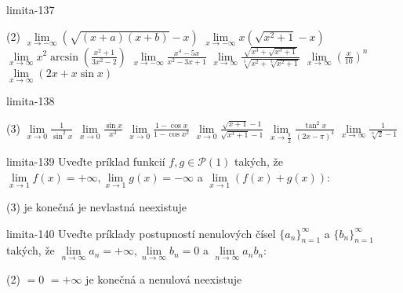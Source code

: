 \begin{defproblem}{limita-137}
\begin{tasks}(2)
    \task $\lim\limits_{{x \rightarrow -\infty}} (\sqrt{(x+a)(x+b)}-x)$
    \task $\lim\limits_{{x \rightarrow -\infty}} x(\sqrt{x^2+1}-x)$
    \task $\lim\limits_{{x \rightarrow \infty}} x^2 \arcsin(\frac{x^2+1}{3x^2-2})$
    \task $\lim\limits_{{x \rightarrow -\infty}} \frac{x^4-5x}{x^2-3x+1}$
    \task $\lim\limits_{{x \rightarrow \infty}} \frac{\sqrt{x^3+\sqrt{x^3+1}}}{\sqrt[3]{x^2+\sqrt[3]{x^2+1}}}$
    \task $\lim\limits_{{x \rightarrow \infty}} (\frac{x}{10})^n$
    \task $\lim\limits_{{x \rightarrow \infty}} (2x+x \sin x)$
\end{tasks}
\end{defproblem}

\begin{defproblem}{limita-138}
\begin{tasks}(3)
    \task $\lim\limits_{{x \rightarrow 0}} \frac{1}{\sin ^2 x}$
    \task $\lim\limits_{{x \rightarrow 0}} \frac{\sin x}{x^3}$
    \task $\lim\limits_{{x \rightarrow 0}} \frac{1-\cos x}{1-\cos x^2}$
    \task $\lim\limits_{{x \rightarrow 0}} \frac{\sqrt{x+1}-1}{\sqrt{x^3+1}-1}$
    \task $\lim\limits_{{x \rightarrow \frac{\pi}{2}}} \frac{\tan ^2 x}{(2x-\pi)^4}$
    \task $\lim\limits_{{x \rightarrow \infty}} \frac{1}{\sqrt[n]{2}-1}$
\end{tasks}
\end{defproblem}

\begin{defproblem}{limita-139}
Uveďte príklad funkcií $f,g \in \mathcal{P}(1)$ takých, že $\lim\limits_{x
\rightarrow 1} f(x)=+\infty,\lim\limits_{x \rightarrow 1} g(x)=-\infty$ a
$\lim\limits_{x \rightarrow 1} (f(x)+g(x))$:
\begin{tasks}(3)
\task je konečná
\task je nevlastná
\task neexistuje
\end{tasks}
\end{defproblem}

\begin{defproblem}{limita-140}
Uveďte príklady postupností nenulových čísel ${\{a_n\}}_{n=1}^\infty$ a
${\{b_n\}}_{n=1}^\infty$ takých, že $\lim\limits_{n \rightarrow \infty}
a_n=+\infty,\lim\limits_{n \rightarrow \infty} b_n=0$ a $\lim\limits_{n
\rightarrow \infty} a_nb_n$:
\begin{tasks}(2)
\task $=0$
\task $=+\infty$
\task je konečná a nenulová
\task neexistuje
\end{tasks}
\end{defproblem}


